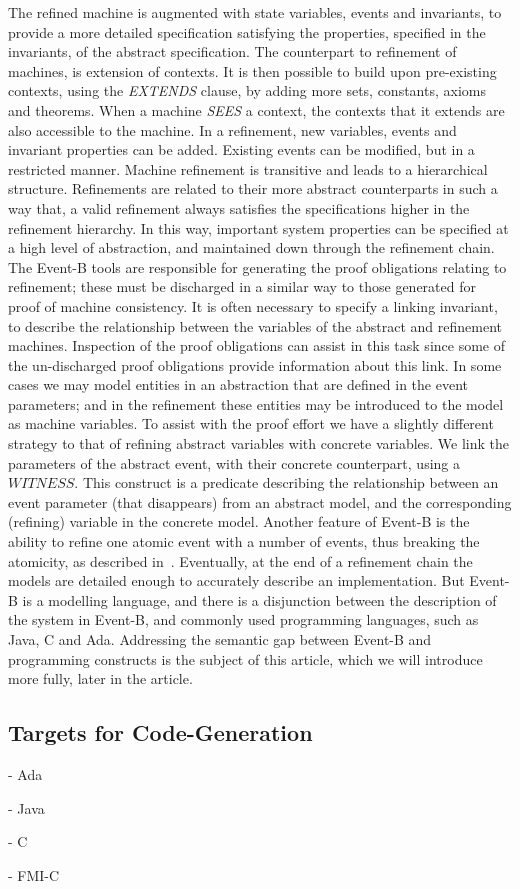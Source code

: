 The refined machine is augmented with state variables, events and invariants, to provide a more detailed specification satisfying the properties, specified in the invariants, of the abstract specification. The counterpart to refinement of machines, is extension of contexts. It is then possible to build upon pre-existing contexts, using the \emph{EXTENDS} clause, by adding more sets, constants, axioms and theorems. When a machine \emph{SEES} a context, the contexts that it extends are also accessible to the machine. In a refinement, new variables, events and invariant properties can be added. Existing events can be modified, but in a restricted manner. Machine refinement is transitive and leads to a hierarchical structure. Refinements are related to their more abstract counterparts in such a way that, a valid refinement always satisfies the specifications higher in the refinement hierarchy. In this way, important system properties can be specified at a high level of abstraction, and maintained down through the refinement chain. The Event-B tools are responsible for generating the proof obligations relating to refinement; these must be discharged in a similar way to those generated for proof of machine consistency. It is often necessary to specify a linking invariant, to describe the relationship between the variables of the abstract and refinement machines. Inspection of the proof obligations can assist in this task since some of the un-discharged proof obligations provide information about this link. In some cases we may model entities in an abstraction that are defined in the event parameters; and in the refinement these entities may be introduced to the model as machine variables. To assist with the proof effort we have a slightly different strategy to that of refining abstract variables with concrete variables. We link the parameters of the abstract event, with their concrete counterpart, using a $WITNESS$. This construct is a predicate describing the relationship between an event parameter (that disappears) from an abstract model, and the corresponding (refining) variable in the concrete model. Another feature of Event-B is the ability to  refine one atomic event with a number of events, thus breaking the atomicity, as described in~\cite{Butler08}. Eventually, at the end of a refinement chain the models are detailed enough to accurately describe an implementation. But Event-B is a modelling language, and there is a disjunction between the description of the system in Event-B, and commonly used programming languages, such as Java, C and Ada. Addressing the semantic gap between Event-B and programming constructs is the subject of this article, which we will introduce more fully, later in the article. 
%
\subsection{Targets for Code-Generation}

- Ada

- Java

- C

- FMI-C
